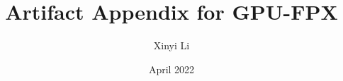 \documentclass{article}
\title{Artifact Appendix for GPU-FPX}
\author{Xinyi Li}
\date{April 2022}
\begin{document}
	
	\maketitle
	\begin{comment}
		\section*{Summary}
		We have evaluated GPU-FPX on a total of 115 GPU programs. Here we will demonstrate how to use GPU-FPX and how we are running all the programs in our paper. 
		Beforehand, we are using two machines in our evaluation. We will refer to machine 1 and machine 2 in the following demonstration when talking about the hardware settings. 
		
		\textbf{Machine 1: }
		\begin{compactenum}
			\item an AMD Ryzen 5 3600 6-Core processor;
			\item a NVIDIA GeForce RTX 2070 SUPER GPU (Turing architecture and 8 GB memory);
			\item the Ubuntu 20.04.3 LTS system;
		\end{compactenum}
		
		\textbf{Machine 2: }
		\begin{compactenum}
			\item Intel(R) Core(TM) i9-10900K CPU (10 cores) @ 3.79 GHz;
			\item a NVIDIA GeForce RTX 3060 GPU (Ampere architecture and 12 GB memory);
			\item the Ubuntu 20.04.4 LTS system;
		\end{compactenum}
		We built GPU-FPX on machine 1 using CUDA-11.5 toolkit, and on machine 2 using CUDA-11.6.
		\begin{enumerate}
			\item \textbf{Build and use GPU-FPX}
			To build the GPU-FPX, we need to download NVBit\footnote{https://github.com/NVlabs/NVBit/releases}, and put our GPU-FPX source codes into the {\tt tools} directory. We ran {\tt make} inside the GPU-FPX folder to generate a shared library {\tt GPU-FPX.so} which can be injected into any CUDA-based executables with {\tt LD\_PRELOAD} like the following: 
			\begin{verbatim}
				LD_PRELOAD=GPU-FPX.so ./program_to_evaluate
			\end{verbatim} 
			\item \textbf{FPXBench}
			\item \textbf{CUDA-Samples}
			\item  \textbf{NPG-GPU}
			\item \textbf{ CuMF-Movielens}
			\item \textbf{HPCG}
		\end{enumerate}
	\end{comment}
	
\end{document}
